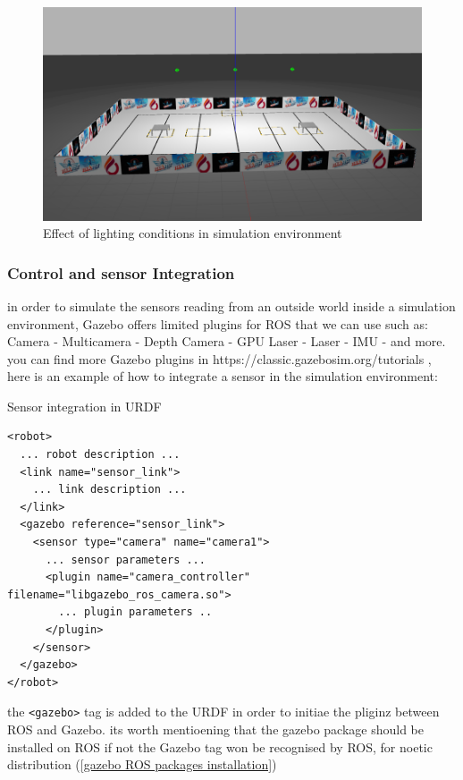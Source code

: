 \documentclass[../../main]{subfiles}
\begin{document}
  \begin{figure}[H]
    \centering
\includegraphics[width=\textwidth]{fig/competition_area_light.png}
\caption{Effect of lighting conditions in simulation environment}
\label{Competition area with good lighting} %
\end{figure}


\subsubsection{Control and sensor Integration} 

in order to simulate the sensors reading from an outside world inside a simulation environment, Gazebo offers limited plugins for ROS that we can use such as:
Camera - Multicamera - Depth Camera - GPU Laser - Laser - IMU - and more.
you can find more Gazebo plugins in https://classic.gazebosim.org/tutorials ,
here is an example of how to integrate a  sensor in the simulation environment:

\newpage
\begin{codebox}[]{Sensor integration in URDF}
  \begin{verbatim}
<robot>
  ... robot description ...
  <link name="sensor_link">
    ... link description ...
  </link>
  <gazebo reference="sensor_link">
    <sensor type="camera" name="camera1">
      ... sensor parameters ...
      <plugin name="camera_controller" filename="libgazebo_ros_camera.so">
        ... plugin parameters ..
      </plugin>
    </sensor>
  </gazebo>
</robot>
\end{verbatim}
  \end{codebox}

the \texttt{<gazebo>} tag is added to the URDF in order to initiae the pliginz between ROS and Gazebo.
its worth mentioening that the gazebo package should be installed on ROS if not the Gazebo tag won be recognised by ROS, for noetic distribution (\cref{gazebo ROS packages installation})
\end{document}
